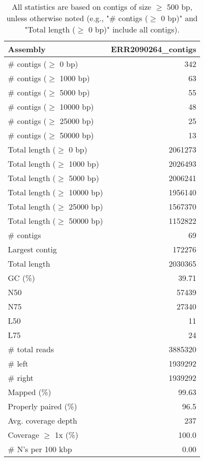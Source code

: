 \documentclass[12pt,a4paper]{article}
\begin{document}
\begin{table}[ht]
\begin{center}
\caption{All statistics are based on contigs of size $\geq$ 500 bp, unless otherwise noted (e.g., "\# contigs ($\geq$ 0 bp)" and "Total length ($\geq$ 0 bp)" include all contigs).}
\begin{tabular}{|l*{1}{|r}|}
\hline
Assembly & ERR2090264\_contigs \\ \hline
\# contigs ($\geq$ 0 bp) & 342 \\ \hline
\# contigs ($\geq$ 1000 bp) & 63 \\ \hline
\# contigs ($\geq$ 5000 bp) & 55 \\ \hline
\# contigs ($\geq$ 10000 bp) & 48 \\ \hline
\# contigs ($\geq$ 25000 bp) & 25 \\ \hline
\# contigs ($\geq$ 50000 bp) & 13 \\ \hline
Total length ($\geq$ 0 bp) & 2061273 \\ \hline
Total length ($\geq$ 1000 bp) & 2026493 \\ \hline
Total length ($\geq$ 5000 bp) & 2006241 \\ \hline
Total length ($\geq$ 10000 bp) & 1956140 \\ \hline
Total length ($\geq$ 25000 bp) & 1567370 \\ \hline
Total length ($\geq$ 50000 bp) & 1152822 \\ \hline
\# contigs & 69 \\ \hline
Largest contig & 172276 \\ \hline
Total length & 2030365 \\ \hline
GC (\%) & 39.71 \\ \hline
N50 & 57439 \\ \hline
N75 & 27340 \\ \hline
L50 & 11 \\ \hline
L75 & 24 \\ \hline
\# total reads & 3885320 \\ \hline
\# left & 1939292 \\ \hline
\# right & 1939292 \\ \hline
Mapped (\%) & 99.63 \\ \hline
Properly paired (\%) & 96.5 \\ \hline
Avg. coverage depth & 237 \\ \hline
Coverage $\geq$ 1x (\%) & 100.0 \\ \hline
\# N's per 100 kbp & 0.00 \\ \hline
\end{tabular}
\end{center}
\end{table}
\end{document}

